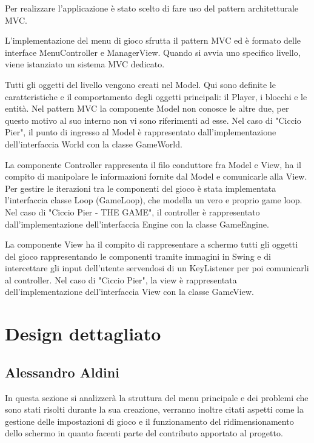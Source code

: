 \documentclass[a4paper,12pt]{report}
\newcommand{\gametitle}{Ciccio Pier - THE GAME}
\begin{document}
    Per realizzare l'applicazione è stato scelto di fare uso del pattern architetturale MVC.

    L'implementazione del menu di gioco sfrutta il pattern MVC ed è formato delle interface MenuController e ManagerView. Quando si avvia uno specifico livello, viene istanziato un sistema MVC dedicato.

    Tutti gli oggetti del livello vengono creati nel Model. Qui sono definite le caratteristiche e il comportamento degli oggetti principali: il Player, i blocchi e le entità. Nel pattern MVC la componente Model non conosce le altre due, per questo motivo al suo interno non vi sono riferimenti ad esse. Nel caso di "Ciccio Pier", il punto di ingresso al Model è rappresentato dall'implementazione dell'interfaccia World con la classe GameWorld.

    La componente Controller rappresenta il filo conduttore fra Model e View, ha il compito di manipolare le informazioni fornite dal Model e comunicarle alla View. Per gestire le iterazioni tra le componenti del gioco è stata implementata l'interfaccia classe Loop (GameLoop), che modella un vero e proprio game loop. Nel caso di "\gametitle", il controller è rappresentato dall'implementazione dell'interfaccia Engine con la classe GameEngine.

    La componente View ha il compito di rappresentare a schermo tutti gli oggetti del gioco rappresentando le componenti tramite immagini in Swing e di intercettare gli input dell'utente servendosi di un KeyListener per poi comunicarli al controller. Nel caso di "Ciccio Pier", la view è rappresentata dell'implementazione dell'interfaccia View con la classe GameView.


    \section{Design dettagliato}

    \subsection*{Alessandro Aldini}

    In questa sezione si analizzerà la struttura del menu principale e dei problemi che sono stati risolti durante la sua creazione, verranno inoltre citati aspetti come la gestione delle impostazioni di gioco e il funzionamento del ridimensionamento dello schermo in quanto facenti parte del contributo apportato al progetto.
\end{document}
